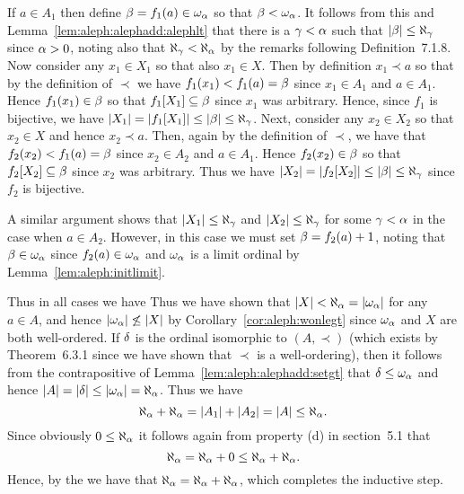 {{If $a \in A_1$ then define $\beta = f_1(a) \in \omega_\alpha$ so that $\beta < \omega_\alpha$.
It follows from this and Lemma~\ref{lem:aleph:alephadd:alephlt} that there is a $\gamma < \alpha$ such that $\left| \beta \right| \leq \aleph_\gamma$ since $\alpha > 0$, noting also that $\aleph_\gamma < \aleph_\alpha$ by the remarks following Definition~7.1.8.
Now consider any $x_1 \in X_1$ so that also $x_1 \in X$.
Then by definition $x_1 \prec a$ so that by the definition of $\prec$ we have $f_1(x_1) < f_1(a) = \beta$ since $x_1 \in A_1$ and $a \in A_1$.
Hence $f_1(x_1) \in \beta$ so that $f_1[X_1] \subseteq \beta$ since $x_1$ was arbitrary.
Hence, since $f_1$ is bijective, we have $\left| X_1 \right| = \left| f_1[X_1] \right| \leq \left| \beta \right| \leq \aleph_\gamma$.
Next, consider any $x_2 \in X_2$ so that $x_2 \in X$ and hence $x_2 \prec a$.
Then, again by the definition of $\prec$, we have that $f_2(x_2) < f_1(a) = \beta$ since $x_2 \in A_2$ and $a \in A_1$.
Hence $f_2(x_2) \in \beta$ so that $f_2[X_2] \subseteq \beta$ since $x_2$ was arbitrary.
Thus we have $\left| X_2 \right| = \left| f_2[X_2] \right| \leq \left| \beta \right| \leq \aleph_\gamma$ since $f_2$ is bijective.

A similar argument shows that $\left| X_1 \right| \leq \aleph_\gamma$ and $\left| X_2 \right| \leq \aleph_\gamma$ for some $\gamma < \alpha$ in the case when $a \in A_2$.
However, in this case we must set $\beta = f_2(a) + 1$, noting that $\beta \in \omega_\alpha$ since $f_2(a) \in \omega_\alpha$ and $\omega_\alpha$ is a limit ordinal by Lemma~\ref{lem:aleph:initlimit}.

Thus in all cases we have
Thus we have shown that $\left| X \right| < \aleph_\alpha = \left| \omega_\alpha \right|$ for any $a \in A$, and hence $\left| \omega_\alpha \right| \not\leq \left| X \right|$ by Corollary~\ref{cor:aleph:wonlegt} since $\omega_\alpha$ and $X$ are both well-ordered.
If $\delta$ is the ordinal isomorphic to $(A, \prec)$ (which exists by Theorem~6.3.1 since we have shown that $\prec$ is a well-ordering), then it follows from the contrapositive of Lemma~\ref{lem:aleph:alephadd:setgt} that $\delta \leq \omega_\alpha$ and hence $\left| A \right| = \left| \delta \right| \leq \left| \omega_\alpha \right| = \aleph_\alpha$.
Thus we have
$$
  \aleph_\alpha + \aleph_\alpha = \left| A_1 \right| + \left| A_2 \right| = \left| A \right| \leq \aleph_\alpha.
$$
Since obviously $0 \leq \aleph_\alpha$ it follows again from property (d) in section~5.1 that
$$
  \aleph_\alpha = \aleph_\alpha + 0 \leq \aleph_\alpha + \aleph_\alpha.
$$
Hence, by the \cbthrm{} we have that $\aleph_\alpha = \aleph_\alpha + \aleph_\alpha$, which completes the inductive step.
}
}

